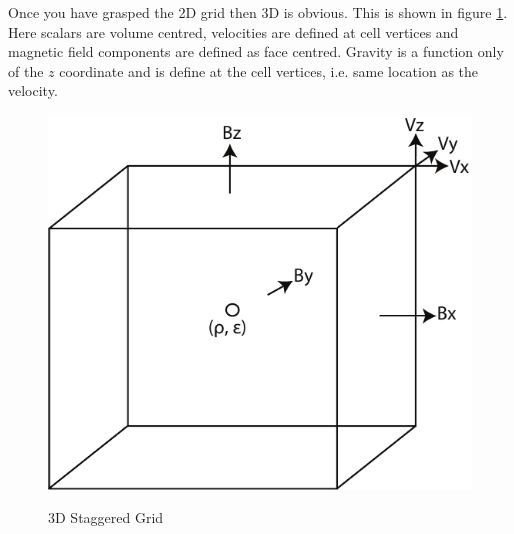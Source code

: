 \documentclass[11pt]{article}
\begin{document}
Once you have grasped the 2D grid then 3D is obvious. This is shown in figure \ref{3d-staggered}. Here scalars are 
volume centred, velocities are defined at cell vertices and magnetic field components are defined as face centred. 
Gravity is a function only of the $z$ coordinate and is define at the cell vertices, i.e. same location as the velocity.
\begin{figure}
\begin{center}{\includegraphics{3d-staggered-grid.pdf}}\end{center}
\caption{3D Staggered Grid}
\label{3d-staggered}
\end{figure}
\end{document}
